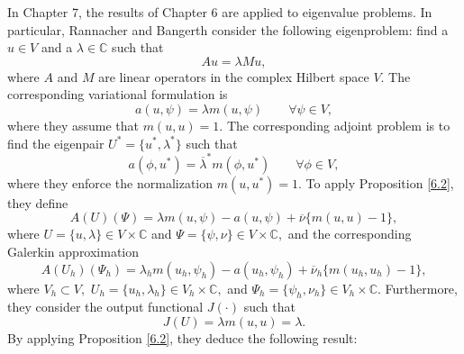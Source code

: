 \documentclass[12pt,a4paper]{article}
\theoremstyle{boldthm}
\theoremstyle{bolddefn}
\begin{document}
In Chapter 7, the results of Chapter 6 are applied to eigenvalue problems. In particular, Rannacher and Bangerth consider the following eigenproblem: find a $u \in V$ and a $\lambda \in \mathbb{C}$ such that
\begin{equation}
    Au = \lambda M u,
\end{equation}
where $A$ and $M$ are linear operators in the complex Hilbert space $V.$ The corresponding variational formulation is 
\begin{equation} \label{primal}
    a(u, \psi) = \lambda m(u, \psi) \qquad \forall \psi \in V,
\end{equation}
where they  assume that $m(u, u)=1.$ The corresponding adjoint problem is to find the eigenpair $U^* = \{u^*, \lambda^*\}$ such that
\begin{equation} \label{dual}
   a(\phi, u^*) = \overline \lambda^* m(\phi, u^*) \qquad \forall \phi \in V, 
\end{equation}
where they enforce the normalization $m(u, u^*) = 1.$
To apply Proposition \ref{6.2}, they define 
\begin{equation}
    A(U)(\Psi) = \lambda m(u, \psi) - a(u, \psi) + \overline \nu \{m(u, u) - 1\},
\end{equation}
where $U = \{u, \lambda\} \in V \times \mathbb{C}$ and $\Psi = \{\psi, \nu\} \in  V \times \mathbb{C},$ and the corresponding Galerkin approximation
\begin{equation}
    A(U_h)(\Psi_h) = \lambda_h m(u_h, \psi_h) - a(u_h, \psi_h) + \overline \nu_h \{m(u_h, u_h) - 1\},
\end{equation}
where $V_h \subset V,$ $U_h = \{u_h, \lambda_h\} \in V_h \times \mathbb{C},$ and $\Psi_h = \{\psi_h, \nu_h\} \in  V_h \times \mathbb{C}.$
Furthermore, they consider the output functional $J(\cdot)$ such that
\begin{equation}
    J(U) = \lambda m(u, u) = \lambda.
\end{equation}
By applying Proposition \ref{6.2}, they deduce the following result:
\end{document}
